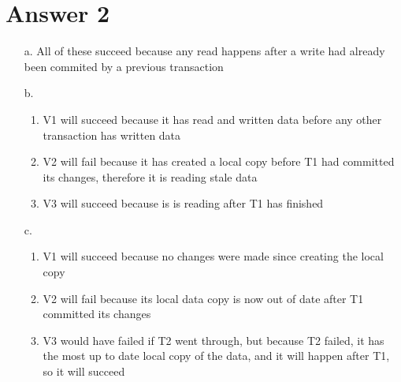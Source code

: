 \documentclass[11pt]{article}
\theoremstyle{definition}
\begin{document}
\section*{Answer 2}
\begin{enumerate}
  \item[a.] All of these succeed because any read happens after a write had already been commited by a previous transaction
  \item[b.]
  \begin{enumerate}
    \item V1 will succeed because it has read and written data before any other transaction has written data
    \item V2 will fail because it has created a local copy before T1 had committed its changes, therefore it is reading stale data
    \item V3 will succeed because is is reading after T1 has finished
  \end{enumerate}
  \item[c.]
  \begin{enumerate}
    \item V1 will succeed because no changes were made since creating the local copy
    \item V2 will fail because its local data copy is now out of date after T1 committed its changes
    \item V3 would have failed if T2 went through, but because T2 failed, it has the most up to date local copy of the data, and it will happen after T1, so it will succeed
  \end{enumerate}
\end{enumerate}
\end{document}
